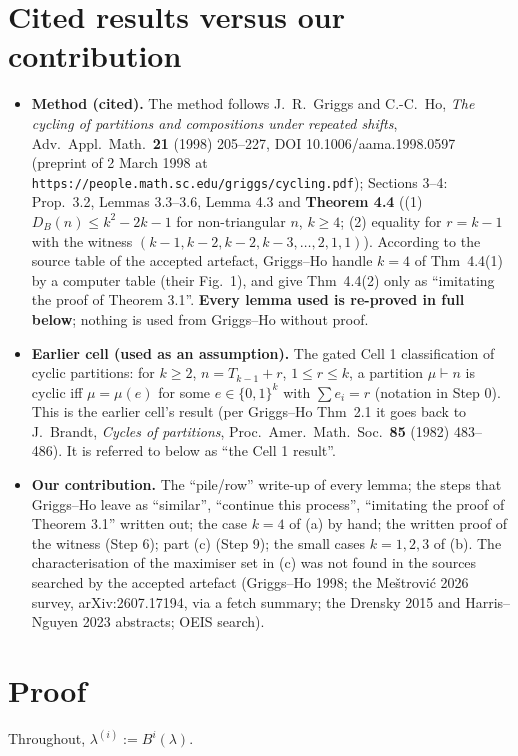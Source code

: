 \documentclass[11pt]{article}
\begin{document}
\section*{Cited results versus our contribution}
\begin{itemize}
\item \textbf{Method (cited).} The method follows J.~R.~Griggs and C.-C.~Ho, \emph{The cycling of partitions and compositions under repeated shifts}, Adv.\ Appl.\ Math.\ \textbf{21} (1998) 205--227, DOI 10.1006/aama.1998.0597 (preprint of 2 March 1998 at \texttt{https://people.math.sc.edu/griggs/cycling.pdf}); Sections 3--4: Prop.~3.2, Lemmas 3.3--3.6, Lemma 4.3 and \textbf{Theorem 4.4} ((1) $D_B(n)\le k^2-2k-1$ for non-triangular $n$, $k\ge4$; (2) equality for $r=k-1$ with the witness $(k-1,k-2,k-2,k-3,\dots,2,1,1)$). According to the source table of the accepted artefact, Griggs--Ho handle $k=4$ of Thm~4.4(1) by a computer table (their Fig.~1), and give Thm~4.4(2) only as ``imitating the proof of Theorem 3.1''. \textbf{Every lemma used is re-proved in full below}; nothing is used from Griggs--Ho without proof.
\item \textbf{Earlier cell (used as an assumption).} The gated Cell 1 classification of cyclic partitions: for $k\ge2$, $n=T_{k-1}+r$, $1\le r\le k$, a partition $\mu\vdash n$ is cyclic iff $\mu=\mu(e)$ for some $e\in\{0,1\}^k$ with $\sum e_i=r$ (notation in Step 0). This is the earlier cell's result (per Griggs--Ho Thm~2.1 it goes back to J.~Brandt, \emph{Cycles of partitions}, Proc.\ Amer.\ Math.\ Soc.\ \textbf{85} (1982) 483--486). It is referred to below as ``the Cell 1 result''.
\item \textbf{Our contribution.} The ``pile/row'' write-up of every lemma; the steps that Griggs--Ho leave as ``similar'', ``continue this process'', ``imitating the proof of Theorem 3.1'' written out; the case $k=4$ of (a) by hand; the written proof of the witness (Step 6); part (c) (Step 9); the small cases $k=1,2,3$ of (b). The characterisation of the maximiser set in (c) was not found in the sources searched by the accepted artefact (Griggs--Ho 1998; the Me\v{s}trovi\'c 2026 survey, arXiv:2607.17194, via a fetch summary; the Drensky 2015 and Harris--Nguyen 2023 abstracts; OEIS search).
\end{itemize}

\section*{Proof}
Throughout, $\lambda^{(i)}:=B^i(\lambda)$.
\end{document}
